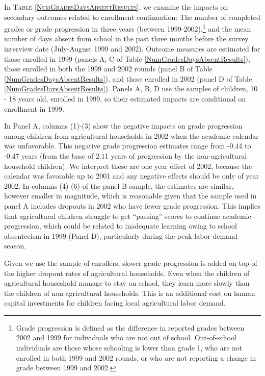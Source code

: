 \documentclass[12pt,letterpaper]{article}\usepackage[margin=1in]{geometry}
\newcommand{\0}{\ensuremath{\mbox{\boldmath $0$}}}
\begin{document}
In \textsc{\small Table \ref{NumGradesDaysAbsentResults}}, we examine the impacts on secondary outcomes related to enrollment continuation: The number of completed grades or grade progression in three years (between 1999-2002),\footnote{Grade progression is defined as the difference in reported grades between 2002 and 1999 for individuals who are not out of school. Out-of-school individuals are those whose schooling is lower than grade 1, who are not enrolled in both 1999 and 2002 rounds, or who are not reporting a change in grade between 1999 and 2002. } and the mean number of days absent from school in the past three months before the survey interview date (July-August 1999 and 2002). Outcome measures are estimated for those enrolled in 1999 (panels A, C of Table \ref{NumGradesDaysAbsentResults}), those enrolled in both the 1999 and 2002 rounds (panel B of Table \ref{NumGradesDaysAbsentResults}), and those enrolled in 2002 (panel D of Table \ref{NumGradesDaysAbsentResults}). Panels A, B, D use the samples of children, 10 - 18 years old, enrolled in 1999, so their estimated impacts are conditional on enrollment in 1999.

In Panel A, columns (1)-(3) show the negative impacts on grade progression among children from agricultural households in 2002 when the academic calendar was unfavorable. This negative grade progression estimates range from -0.44 to -0.47 years (from the base of 2.11 years of progression by the non-agricultural household children). We interpret these are one year effect of 2002, because the calendar was favorable up to 2001 and any negative effects should be only of year 2002. 
In columns (4)-(6) of the panel B sample, the estimates are similar, however smaller in magnitude, which is reasonable given that the sample used in panel A includes dropouts in 2002 who have fewer grade progression. This implies that agricultural children struggle to get ``passing'' scores to continue academic progression, which could be related to inadequate learning owing to school absenteeism in 1999 (Panel D), particularly during the peak labor demand season. 

Given we use the sample of enrollers, slower grade progression is added on top of the higher dropout rates of agricultural households. Even when the children of agricultural houseshold manage to stay on school, they learn more slowly than the children of non-agricultural households. This is an additional cost on human capital investments for children facing local agricultural labor demand.
\end{document}
